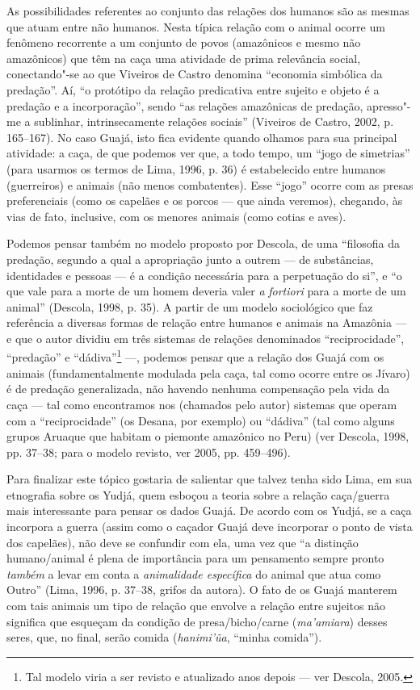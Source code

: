 As possibilidades referentes ao conjunto das relações dos humanos são as
mesmas que atuam entre não humanos. Nesta típica relação com o animal
ocorre um fenômeno recorrente a um conjunto de povos (amazônicos e mesmo
não amazônicos) que têm na caça uma atividade de prima relevância
social, conectando"-se ao que Viveiros de Castro denomina ``economia
simbólica da predação''. Aí, ``o protótipo da relação predicativa entre
sujeito e objeto é a predação e a incorporação'', sendo ``as relações
amazônicas de predação, apresso"-me a sublinhar, intrinsecamente relações
sociais'' (Viveiros de Castro, 2002, p. 165--167). No caso Guajá, isto
fica evidente quando olhamos para sua principal atividade: a caça, de
que podemos ver que, a todo tempo, um ``jogo de simetrias'' (para usarmos
os termos de Lima, 1996, p. 36) é estabelecido entre humanos
(guerreiros) e animais (não menos combatentes). Esse ``jogo'' ocorre com
as presas preferenciais (como os capelães e os porcos --- que ainda
veremos), chegando, às vias de fato, inclusive, com os menores animais
(como cotias e aves).

Podemos pensar também no modelo proposto por Descola, de uma ``filosofia
da predação, segundo a qual a apropriação junto a outrem --- de
substâncias, identidades e pessoas --- é a condição necessária para a
perpetuação do si'', e ``o que vale para a morte de um homem deveria valer
\emph{a} \emph{fortiori} para a morte de um animal'' (Descola, 1998, p.
35). A partir de um modelo sociológico que faz referência a diversas
formas de relação entre humanos e animais na Amazônia --- e que o autor
dividiu em três sistemas de relações denominados ``reciprocidade'',
``predação'' e ``dádiva''\footnote{Tal modelo viria a ser revisto e
  atualizado anos depois --- ver Descola, 2005.} ---, podemos pensar que a
relação dos Guajá com os animais (fundamentalmente modulada pela caça,
tal como ocorre entre os Jívaro) é de predação generalizada, não havendo
nenhuma compensação pela vida da caça --- tal como encontramos nos
(chamados pelo autor) sistemas que operam com a ``reciprocidade'' (os
Desana, por exemplo) ou ``dádiva'' (tal como alguns grupos Aruaque que
habitam o piemonte amazônico no Peru) (ver Descola, 1998, pp. 37--38;
para o modelo revisto, ver 2005, pp. 459--496).

Para finalizar este tópico gostaria de salientar que talvez tenha sido
Lima, em sua etnografia sobre os Yudjá, quem esboçou a teoria sobre a
relação caça/guerra mais interessante para pensar os dados Guajá. De
acordo com os Yudjá, se a caça incorpora a guerra (assim como o caçador
Guajá deve incorporar o ponto de vista dos capelães), não deve se
confundir com ela, uma vez que ``a distinção humano/animal é plena de
importância para um pensamento sempre pronto \emph{também} a levar em
conta a \emph{animalidade específica} do animal que atua como Outro''
(Lima, 1996, p. 37--38, grifos da autora). O fato de os Guajá manterem
com tais animais um tipo de relação que envolve a relação entre sujeitos
não significa que esqueçam da condição de presa/bicho/carne
(\emph{ma'amiara}) desses seres, que, no final, serão comida
(\emph{hanimi'ũa}, ``minha comida'').

